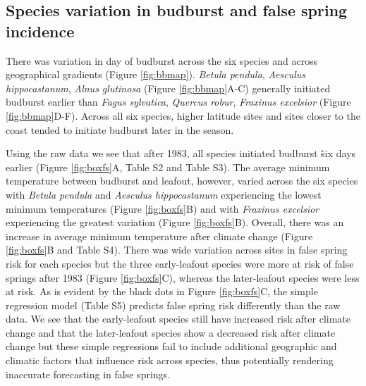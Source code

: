 \documentclass{article}\usepackage[]{graphicx}\usepackage[]{color}
\begin{document}
\subsection*{Species variation in budburst and false spring incidence}
There was variation in day of budburst across the six species and across geographical gradients (Figure \ref{fig:bbmap}). \textit{Betula pendula}, \textit{Aesculus hippocastanum}, \textit{Alnus glutinosa} (Figure \ref{fig:bbmap}A-C) generally initiated budburst earlier than \textit{Fagus sylvatica}, \textit{Quercus robur}, \textit{Fraxinus excelsior} (Figure \ref{fig:bbmap}D-F). Across all six species, higher latitude sites and sites closer to the coast tended to initiate budburst later in the season.  

Using the raw data we see that after 1983, all species initiated budburst \~ six days earlier (Figure \ref{fig:boxfs}A, Table S2 and Table S3). The average minimum temperature between budburst and leafout, however, varied across the six species with \textit{Betula pendula} and \textit{Aesculus hippocastanum} experiencing the lowest minimum temperatures (Figure \ref{fig:boxfs}B) and with \textit{Fraxinus excelsior} experiencing the greatest variation (Figure \ref{fig:boxfs}B). Overall, there was an increase in average minimum temperature after climate change (Figure \ref{fig:boxfs}B and Table S4). There was wide variation across sites in false spring risk for each species but the three early-leafout species were more at risk of false springs after 1983 (Figure \ref{fig:boxfs}C), whereas the later-leafout species were less at risk. As is evident by the black dots in Figure \ref{fig:boxfs}C, the simple regression model (Table S5) predicts false spring risk differently than the raw data. We see that the early-leafout species still have increased risk after climate change and that the later-leafout species show a decreased risk after climate change but these simple regressions fail to include additional geographic and climatic factors that influence risk across species, thus potentially rendering inaccurate forecasting in false springs. 
\end{document}
